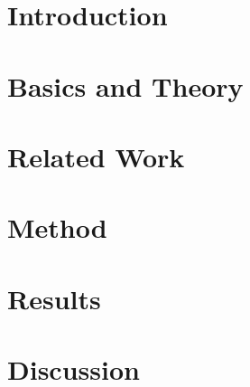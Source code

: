 \documentclass{srhthesis}
\begin{document}

\maketitle







\thesisTables
\thesisBodyStart



\chapter{Introduction}


\chapter{Basics and Theory}


\chapter{Related Work}


\chapter{Method}


\chapter{Results}


\chapter{Discussion}

\end{document}
